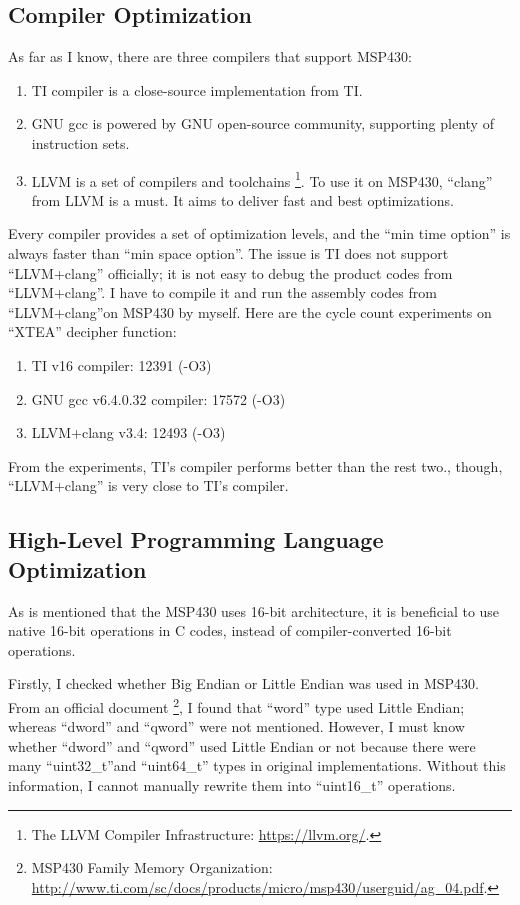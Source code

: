 \documentclass[sigconf, review=false]{acmart}
\begin{document}
\subsection{Compiler Optimization}
As far as I know, there are three compilers that support MSP430:

\begin{enumerate}
    \item TI compiler is a close-source implementation from TI.
    \item GNU gcc is powered by GNU open-source community, supporting plenty of instruction sets.
    \item LLVM is a set of compilers and toolchains \footnote{The LLVM Compiler Infrastructure: \url{https://llvm.org/}.}.
          To use it on MSP430, ``clang'' from LLVM is a must. It aims to deliver fast and best optimizations.
\end{enumerate}

Every compiler provides a set of optimization levels, and the ``min time option'' is always faster than ``min space option''.
The issue is TI does not support ``LLVM+clang'' officially; it is not easy to debug the product codes from ``LLVM+clang''.
I have to compile it and run the assembly codes from ``LLVM+clang''on MSP430 by myself.
Here are the cycle count experiments on ``XTEA'' decipher function:

\begin{enumerate}
    \item TI v16 compiler: 12391 (-O3)
    \item GNU gcc v6.4.0.32 compiler: 17572 (-O3)
    \item LLVM+clang v3.4: 12493 (-O3)
\end{enumerate}

From the experiments, TI's compiler performs better than the rest two.,
though, ``LLVM+clang'' is very close to TI's compiler.


\subsection{High-Level Programming Language Optimization}
As is mentioned that the MSP430 uses 16-bit architecture, it is beneficial to use native 16-bit operations in C codes,
instead of compiler-converted 16-bit operations.

Firstly, I checked whether Big Endian or Little Endian was used in MSP430.
From an official document \footnote{MSP430 Family Memory Organization: \url{http://www.ti.com/sc/docs/products/micro/msp430/userguid/ag_04.pdf}.},
I found that ``word'' type used Little Endian; whereas ``dword'' and ``qword'' were not mentioned.
However, I must know whether ``dword'' and ``qword'' used Little Endian or not
because there were many ``uint32\_t''and ``uint64\_t'' types in original implementations.
Without this information, I cannot manually rewrite them into ``uint16\_t'' operations.
\end{document}
